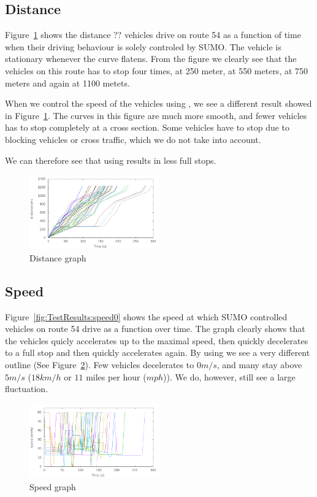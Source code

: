 \subsection{Distance}
Figure~\ref{fig:TestResults:distance100} shows the distance ?? vehicles drive on route 54 as a function of time when their driving behaviour is solely controled by SUMO. 
The vehicle is stationary whenever the curve flatens.
From the figure we clearly see that the vehicles on this route has to stop four times, at 250 meter, at 550 meters, at 750 meters and again at 1100 metets.

When we control the speed of the vehicles using \tech, we see a different result showed in Figure~\ref{fig:TestResults:distance100}.
The curves in this figure are much more smooth, and fewer vehicles has to stop completely at a cross section.
Some vehicles have to stop due to blocking vehicles or cross traffic, which we do not take into account.

We can therefore see that using \tech results in less full stops.


\begin{figure}[htb]
\includegraphics[width=0.5\textwidth]{images/tp0/distance100.png}
\caption{Distance graph}
\label{fig:TestResults:distance100}
\end{figure}

\subsection{Speed}
Figure~\ref{fig:TestResults:speed0} shows the speed at which SUMO controlled vehicles on route 54 drive as a function over time.
The graph clearly shows that the vehicles quicly accelerates up to the maximal speed, then quickly decelerates to a full stop and then quickly accelerates again.
By using \tech we see a very different outline (See Figure~\ref{fig:TestResults:speed100}).
Few vehicles decelerates to $0 m/s$, and many stay above $5 m/s$ ($18 km/h$ or $11$ miles per hour ($mph$)).
We do, however, still see a large fluctuation.
\begin{figure}[htb]
\includegraphics[width=0.5\textwidth]{images/tp0/speed100.png}
\caption{Speed graph}
\label{fig:TestResults:speed100}
\end{figure}



